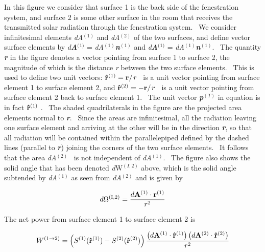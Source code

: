 In this figure we consider that surface 1 is the back side of the fenestration system, and surface 2 is some other surface in the room that receives the transmitted solar radiation through the fenestration system.~ We consider infinitesimal elements \emph{dA}\(^{(1)}\) and \emph{dA}\(^{(2)}\) of the two surfaces, and define vector surface elements by \emph{d\textbf{A}}\textbf{\(^{(}\)}\(^{1)}\) = \emph{dA}\(^{(1)}\)\textbf{\emph{n}}\(^{(1)}\) and \emph{d\textbf{A}}\textbf{\(^{(}\)}\(^{1)}\) = \emph{dA}\(^{(1)}\)\textbf{\emph{n}}\(^{(1)}\).~ The quantity \textbf{\emph{r}} in the figure denotes a vector pointing from surface 1 to surface 2, the magnitude of which is the distance \emph{r} between the two surface elements.~ This is used to define two unit vectors: \({{\bf{\hat r}}^{{\rm{(1)}}}} = {{\bf{r}} \mathord{\left/ {\vphantom {{\bf{r}} r}} \right. } r}\) ~is a unit vector pointing from surface element 1 to surface element 2, and \({{\bf{\hat r}}^{{\rm{(2)}}}} = - {{\bf{r}} \mathord{\left/ {\vphantom {{\bf{r}} r}} \right. } r}\) ~is a unit vector pointing from surface element 2 back to surface element 1.~ The unit vector \textbf{\emph{p}}\(^{(T)}\) in equation is in fact \({{\bf{\hat r}}^{{\rm{(1)}}}}\) .~ The shaded quadrilaterals in the figure are the projected area elements normal to \textbf{\emph{r}}.~ Since the areas are infinitesimal, all the radiation leaving one surface element and arriving at the other will be in the direction \textbf{\emph{r}}, so that all radiation will be contained within the parallelepiped defined by the dashed lines (parallel to \textbf{\emph{r}}) joining the corners of the two surface elements.~ It follows that the area \emph{dA}\(^{(2)}\)~ is not independent of \emph{dA}\(^{(1)}\).~ The figure also shows the solid angle that has been denoted \emph{d}W\(^{(I,2)}\) above, which is the solid angle subtended by \emph{dA}\(^{(1)}\) as seen from \emph{dA}\(^{(2)}\) and is given by

\begin{equation}
d{\Omega ^{{\rm{(I,2)}}}} = \frac{{d{{\bf{A}}^{{\rm{(1)}}}} \cdot {{\bf{r}}^{{\rm{(1)}}}}}}{{{r^2}}}
\end{equation}

The net power from surface element 1 to surface element 2 is

\begin{equation}
{W^{(1 \to 2)}} = \left( {{S^{{\rm{(1)}}}}({{{\bf{\hat r}}}^{{\rm{(1)}}}}) - {S^{{\rm{(2)}}}}({{{\bf{\hat r}}}^{{\rm{(2)}}}})} \right)\frac{{\left( {d{{\bf{A}}^{{\rm{(1)}}}} \cdot {{{\bf{\hat r}}}^{{\rm{(1)}}}}} \right)\left( {d{{\bf{A}}^{{\rm{(2)}}}} \cdot {{{\bf{\hat r}}}^{{\rm{(2)}}}}} \right)}}{{{r^2}}}
\end{equation}

